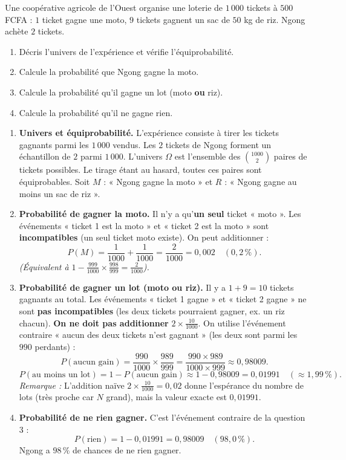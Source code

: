 \documentclass[11pt]{article}
\begin{document}
\begin{exercice}
Une coopérative agricole de l'Ouest organise une loterie de $1\,000$ tickets à $500$ FCFA : $1$ ticket gagne une moto, $9$ tickets gagnent un sac de $50$ kg de riz. Ngong achète $2$ tickets.
\begin{enumerate}
\item Décris l'univers de l'expérience et vérifie l'équiprobabilité.
\item Calcule la probabilité que Ngong gagne la moto.
\item Calcule la probabilité qu'il gagne un lot (moto \textbf{ou} riz).
\item Calcule la probabilité qu'il ne gagne rien.
\end{enumerate}
\end{exercice}

\begin{corrige}
\begin{enumerate}
\item \textbf{Univers et équiprobabilité.} L'expérience consiste à tirer les tickets gagnants parmi les $1\,000$ vendus. Les $2$ tickets de Ngong forment un échantillon de $2$ parmi $1\,000$. L'univers $\Omega$ est l'ensemble des $\binom{1000}{2}$ paires de tickets possibles. Le tirage étant au hasard, toutes ces paires sont équiprobables.
      Soit $M$ : « Ngong gagne la moto » et $R$ : « Ngong gagne au moins un sac de riz ».
\item \textbf{Probabilité de gagner la moto.} Il n'y a qu'\textbf{un seul} ticket « moto ». Les événements « ticket 1 est la moto » et « ticket 2 est la moto » sont \textbf{incompatibles} (un seul ticket moto existe). On peut additionner :
      \[ P(M) = \frac{1}{1000} + \frac{1}{1000} = \frac{2}{1000} = 0{,}002 \quad (0{,}2\,\%). \]
      \textit{(Équivalent à $1 - \frac{999}{1000} \times \frac{998}{999} = \frac{2}{1000}$).}
\item \textbf{Probabilité de gagner un lot (moto ou riz).} Il y a $1 + 9 = 10$ tickets gagnants au total. Les événements « ticket 1 gagne » et « ticket 2 gagne » ne sont \textbf{pas incompatibles} (les deux tickets pourraient gagner, ex. un riz chacun). \textbf{On ne doit pas additionner} $2 \times \frac{10}{1000}$.
      On utilise l'événement contraire « aucun des deux tickets n'est gagnant » (les deux sont parmi les $990$ perdants) :
      \[
      P(\text{aucun gain}) = \frac{990}{1000} \times \frac{989}{999} = \frac{990 \times 989}{1000 \times 999} \approx 0{,}98009.
      \]
      \[
      P(\text{au moins un lot}) = 1 - P(\text{aucun gain}) \approx 1 - 0{,}98009 = 0{,}01991 \quad (\approx 1{,}99\,\%).
      \]
      \textit{Remarque :} L'addition naïve $2 \times \frac{10}{1000} = 0{,}02$ donne l'espérance du nombre de lots (très proche car $N$ grand), mais la valeur exacte est $0{,}01991$.
\item \textbf{Probabilité de ne rien gagner.} C'est l'événement contraire de la question 3 :
      \[ P(\text{rien}) = 1 - 0{,}01991 = 0{,}98009 \quad (98{,}0\,\%). \]
      Ngong a $98\,\%$ de chances de ne rien gagner.
\end{enumerate}
\end{corrige}
\end{document}
